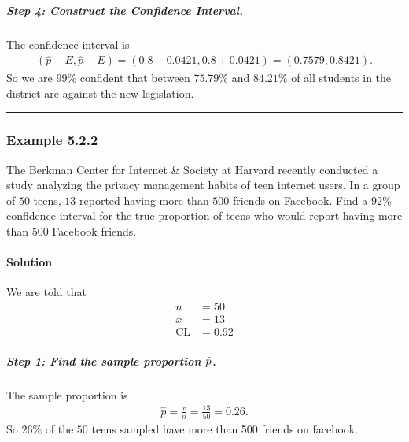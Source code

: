 \documentclass[letterpaper,10pt,english]{jupyterBook}
\begin{document}
\subparagraph{Step 4: Construct the Confidence Interval.}
\label{\detokenize{Ch5 Confidence Intervals/5.2 Estimating Population Proportions:step-4-construct-the-confidence-interval}}
\sphinxAtStartPar
The confidence interval is
\begin{equation*}
\begin{split} (\hat{p} - E, \hat{p} + E) = (0.8 - 0.0421, 0.8 + 0.0421) = (0.7579, 0.8421). \end{split}
\end{equation*}
\sphinxAtStartPar
So we are \(99\%\) confident that between \(75.79\%\) and \(84.21\%\) of all students in the district are against the new legislation.


\bigskip\hrule\bigskip



\subsubsection{Example 5.2.2}
\label{\detokenize{Ch5 Confidence Intervals/5.2 Estimating Population Proportions:example-5-2-2}}
\sphinxAtStartPar
The Berkman Center for Internet \& Society at Harvard recently conducted a study analyzing the privacy management habits of teen internet users. In a group of \(50\) teens, \(13\) reported having more than \(500\) friends on Facebook. Find a \(92\%\) confidence interval for the true proportion of teens who would report having more than \(500\) Facebook friends.


\paragraph{Solution}
\label{\detokenize{Ch5 Confidence Intervals/5.2 Estimating Population Proportions:id1}}
\sphinxAtStartPar
We are told that
\begin{align*}
n &= 50 \\
x &= 13 \\
\text{CL} &= 0.92
\end{align*}

\subparagraph{Step 1: Find the sample proportion \protect\(\hat{p}\protect\).}
\label{\detokenize{Ch5 Confidence Intervals/5.2 Estimating Population Proportions:step-1-find-the-sample-proportion-hat-p}}
\sphinxAtStartPar
The sample proportion is
\begin{equation*}
\begin{split} \hat{p} = \frac{x}{n} = \frac{13}{50} = 0.26. \end{split}
\end{equation*}
\sphinxAtStartPar
So \(26\%\) of the \(50\) teens sampled have more than 500 friends on facebook.
\end{document}
